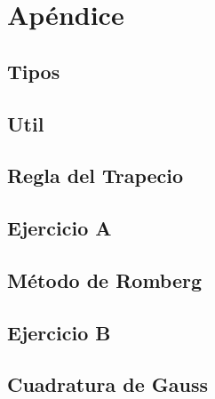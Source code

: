 \section{Apéndice} 

\subsection{Tipos}\label{code:types}


\newpage

\subsection{Util}\label{code:util}


\newpage

\subsection{Regla del Trapecio}\label{code:trapezium}


\newpage

\subsection{Ejercicio A}\label{code:ex1}


\newpage

\subsection{Método de Romberg}\label{code:romberg}


\newpage

\subsection{Ejercicio B}\label{code:ex2}


\newpage

\subsection{Cuadratura de Gauss}\label{code:gauss_quad}

